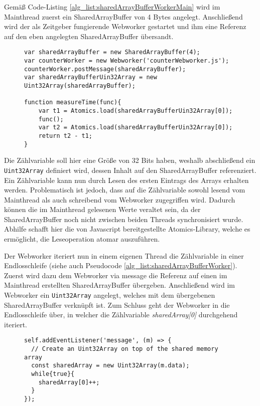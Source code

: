 Gemäß Code-Listing \ref{alg_list:sharedArrayBufferWorkerMain} wird im Mainthread zuerst ein SharedArrayBuffer von 4 Bytes angelegt. Anschließend wird der als Zeitgeber fungierende Webworker gestartet und ihm eine Referenz auf den eben angelegten SharedArrayBuffer übersandt. 

\begin{figure}[h]
\begin{lstlisting}[caption=main.js: Code welcher den counterWorker für Zeitmessungen verwendet,label=alg_list:sharedArrayBufferWorkerMain]
var sharedArrayBuffer = new SharedArrayBuffer(4);
var counterWorker = new Webworker('counterWebworker.js');
counterWorker.postMessage(sharedArrayBuffer);
var sharedArrayBufferUin32Array = new Uint32Array(sharedArrayBuffer);

function measureTime(func){
    var t1 = Atomics.load(sharedArrayBufferUin32Array[0]);
    func();
    var t2 = Atomics.load(sharedArrayBufferUin32Array[0]);
    return t2 - t1;
}
\end{lstlisting}
\end{figure}

Die Zählvariable soll hier eine Größe von 32 Bits haben, weshalb abschließend ein \lstinline{Uint32Array} definiert wird, dessen Inhalt auf den SharedArrayBuffer referenziert. 
Ein Zählvariable kann nun durch Lesen des ersten Eintrags des Arrays erhalten werden. 
Problematisch ist jedoch, dass auf die Zählvariable sowohl lesend vom Mainthread als auch schreibend vom Webworker zugegriffen wird. 
Dadurch können die im Mainthread gelesenen Werte veraltet sein, da der SharedArrayBuffer noch nicht zwischen beiden Threads synchronisiert wurde. 
Abhilfe schafft hier die von Javascript bereitgestellte Atomics-Library, welche es ermöglicht, die Leseoperation atomar auszuführen.

Der Webworker iteriert nun in einem eigenen Thread die Zählvariable in einer Endlosschleife (siehe auch Pseudocode \ref{alg_list:sharedArrayBufferWorker}). 
Zuerst wird dazu dem Webworker via message die Referenz auf einen im Mainthread erstellten SharedArrayBuffer übergeben.
Anschließend wird im Webworker ein \lstinline{Uint32Array} angelegt, welches mit dem übergebenen SharedArrayBuffer verknüpft ist. 
Zum Schluss geht der Webworker in die Endlosschleife über, in welcher die Zählvariable \textit{sharedArray[0]} durchgehend iteriert.

\begin{figure}[h]
\begin{lstlisting}[caption=counterWebworker.js: Webworker welcher die Zählvariable in einer Endlosschleife iteriert,label=alg_list:sharedArrayBufferWorker]
self.addEventListener('message', (m) => {
  // Create an Uint32Array on top of the shared memory array 
  const sharedArray = new Uint32Array(m.data);
  while{true}{
    sharedArray[0]++;
  }
});
\end{lstlisting}
\end{figure}


